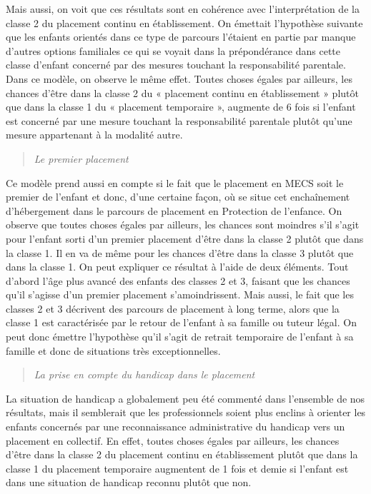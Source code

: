 \documentclass[
  12,
  a4paper,
]{report}
\begin{document}
Mais aussi, on voit que ces résultats sont en cohérence avec
l'interprétation de la classe 2 du placement continu en établissement.
On émettait l'hypothèse suivante que les enfants orientés dans ce type
de parcours l'étaient en partie par manque d'autres options familiales
ce qui se voyait dans la prépondérance dans cette classe d'enfant
concerné par des mesures touchant la responsabilité parentale. Dans ce
modèle, on observe le même effet. Toutes choses égales par ailleurs, les
chances d'être dans la classe 2 du « placement continu en établissement
» plutôt que dans la classe 1 du « placement temporaire », augmente de 6
fois si l'enfant est concerné par une mesure touchant la responsabilité
parentale plutôt qu'une mesure appartenant à la modalité autre.

\begin{quote}
\emph{Le premier placement}
\end{quote}

Ce modèle prend aussi en compte si le fait que le placement en MECS soit
le premier de l'enfant et donc, d'une certaine façon, où se situe cet
enchaînement d'hébergement dans le parcours de placement en Protection
de l'enfance. On observe que toutes choses égales par ailleurs, les
chances sont moindres s'il s'agit pour l'enfant sorti d'un premier
placement d'être dans la classe 2 plutôt que dans la classe 1. Il en va
de même pour les chances d'être dans la classe 3 plutôt que dans la
classe 1. On peut expliquer ce résultat à l'aide de deux éléments. Tout
d'abord l'âge plus avancé des enfants des classes 2 et 3, faisant que
les chances qu'il s'agisse d'un premier placement s'amoindrissent. Mais
aussi, le fait que les classes 2 et 3 décrivent des parcours de
placement à long terme, alors que la classe 1 est caractérisée par le
retour de l'enfant à sa famille ou tuteur légal. On peut donc émettre
l'hypothèse qu'il s'agit de retrait temporaire de l'enfant à sa famille
et donc de situations très exceptionnelles.

\begin{quote}
\emph{La prise en compte du handicap dans le placement}
\end{quote}

La situation de handicap a globalement peu été commenté dans l'ensemble
de nos résultats, mais il semblerait que les professionnels soient plus
enclins à orienter les enfants concernés par une reconnaissance
administrative du handicap vers un placement en collectif. En effet,
toutes choses égales par ailleurs, les chances d'être dans la classe 2
du placement continu en établissement plutôt que dans la classe 1 du
placement temporaire augmentent de 1 fois et demie si l'enfant est dans
une situation de handicap reconnu plutôt que non.
\end{document}
